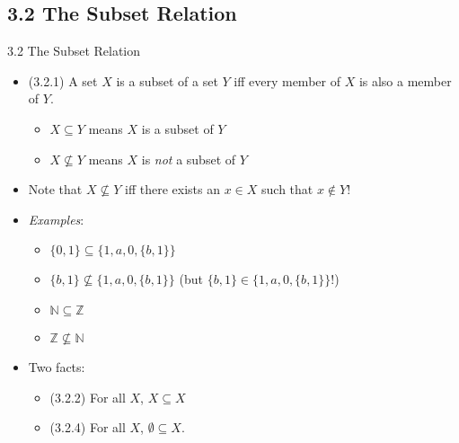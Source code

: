 \documentclass[../slides.tex]{subfiles}
\begin{document}
\subsection{3.2 The Subset Relation}
\begin{frame}{3.2 The Subset Relation}
	
	\begin{itemize}
	
		\item (3.2.1) A set $X$ is a subset of a set $Y$ iff every member of $X$ is also a member of $Y$.
		
		\begin{itemize}
		
			\item $X\subseteq Y$ means $X$ is a subset of $Y$
			
			\item $X\nsubseteq Y$ means $X$ is \emph{not} a subset of $Y$
		
		\end{itemize}
		
		\item Note that $X\nsubseteq Y$ iff there exists an $x\in X$ such that $x\notin Y$!
		
		\item \emph{Examples}:
		
		\begin{itemize}
		
			\item $\{0,1\}\subseteq \{1,a,0,\{b,1\}\}$
			
			\item $\{b,1\}\nsubseteq \{1,a,0,\{b,1\}\}$ (but $\{b,1\}\in \{1,a,0,\{b,1\}\}$!)
			
			\item $\mathbb{N}\subseteq \mathbb{Z}$
			
			\item $\mathbb{Z}\nsubseteq \mathbb{N}$
		
		\end{itemize}
		
		\item Two facts:
		
			\begin{itemize}
			
				\item (3.2.2) For all $X$, $X\subseteq X$
				
				\item (3.2.4) For all $X$, $\emptyset\subseteq X$.
			
			\end{itemize}
	
	\end{itemize}

\end{frame}
\end{document}
